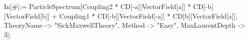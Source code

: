 In[#]:= ParticleSpectrum[Coupling2 * CD[-a][VectorField[a]] * CD[-b][VectorField[b]] + Coupling1 * CD[-b][VectorField[-a]] * CD[b][VectorField[a]], TheoryName -> "SickMaxwellTheory", Method -> "Easy", MaxLaurentDepth -> 3]; 